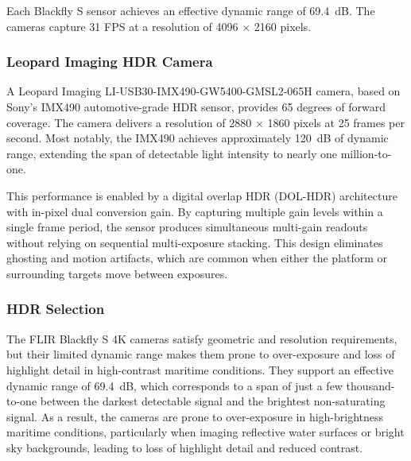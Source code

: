 \documentclass{erauthesis}
\begin{document}
Each Blackfly S sensor achieves an effective dynamic range of 69.4~dB.  
The cameras capture 31 \ac{FPS} at a resolution of 4096 $\times$ 2160 pixels.


\subsubsection{Leopard Imaging HDR Camera} \label{sensors_HDR}

A Leopard Imaging LI-USB30-IMX490-GW5400-GMSL2-065H camera, based on Sony’s IMX490 automotive-grade \ac{HDR} sensor, provides 65 degrees of forward coverage.  
The camera delivers a resolution of 2880 $\times$ 1860 pixels at 25 frames per second.  
Most notably, the IMX490 achieves approximately 120~dB of dynamic range, extending the span of detectable light intensity to nearly one million-to-one.  

This performance is enabled by a digital overlap \ac{HDR} (DOL-HDR) architecture with in-pixel dual conversion gain.  
By capturing multiple gain levels within a single frame period, the sensor produces simultaneous multi-gain readouts without relying on sequential multi-exposure stacking.  
This design eliminates ghosting and motion artifacts, which are common when either the platform or surrounding targets move between exposures.  

\subsubsection{HDR Selection}

The FLIR Blackfly S 4K cameras satisfy geometric and resolution requirements, but their limited dynamic range makes them prone to over-exposure and loss of highlight detail in high-contrast maritime conditions. 
They support an effective dynamic range of 69.4~dB, which corresponds to a span of just a few thousand-to-one between the darkest detectable signal and the brightest non-saturating signal. 
As a result, the cameras are prone to over-exposure in high-brightness maritime conditions, particularly when imaging reflective water surfaces or bright sky backgrounds, leading to loss of highlight detail and reduced contrast. 
\end{document}
